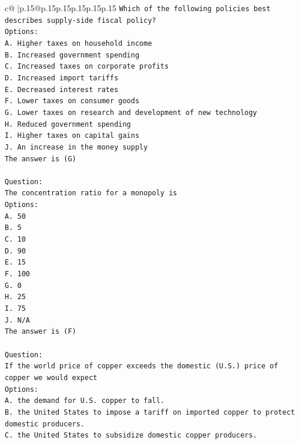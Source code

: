 \documentclass{article}
\begin{document}
{\begin{supertabular}{c@{$\;$}|p{.15\linewidth}@{}p{.15\linewidth}p{.15\linewidth}p{.15\linewidth}p{.15\linewidth}p{.15\linewidth}}
{{{\texttt{Which of the following policies best describes supply{-}side fiscal policy?} \\
\texttt{Options:} \\
\texttt{A. Higher taxes on household income} \\
\texttt{B. Increased government spending} \\
\texttt{C. Increased taxes on corporate profits} \\
\texttt{D. Increased import tariffs} \\
\texttt{E. Decreased interest rates} \\
\texttt{F. Lower taxes on consumer goods} \\
\texttt{G. Lower taxes on research and development of new technology} \\
\texttt{H. Reduced government spending} \\
\texttt{I. Higher taxes on capital gains} \\
\texttt{J. An increase in the money supply} \\
\texttt{The answer is (G)} \\
\\ 
\texttt{Question:} \\
\texttt{The concentration ratio for a monopoly is} \\
\texttt{Options:} \\
\texttt{A. 50} \\
\texttt{B. 5} \\
\texttt{C. 10} \\
\texttt{D. 90} \\
\texttt{E. 15} \\
\texttt{F. 100} \\
\texttt{G. 0} \\
\texttt{H. 25} \\
\texttt{I. 75} \\
\texttt{J. N/A} \\
\texttt{The answer is (F)} \\
\\ 
\texttt{Question:} \\
\texttt{If the world price of copper exceeds the domestic (U.S.) price of copper we would expect} \\
\texttt{Options:} \\
\texttt{A. the demand for U.S. copper to fall.} \\
\texttt{B. the United States to impose a tariff on imported copper to protect domestic producers.} \\
\texttt{C. the United States to subsidize domestic copper producers.} \\
}}}
\end{supertabular}}
\end{document}
